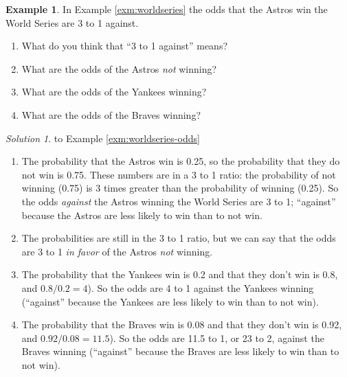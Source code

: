 \documentclass[
]{book}
\providecommand{\tightlist}{%
  \setlength{\itemsep}{0pt}\setlength{\parskip}{0pt}}
\theoremstyle{definition}
\theoremstyle{definition}
\newtheorem{example}{Example}[chapter]
\theoremstyle{definition}
\theoremstyle{remark}
\newtheorem*{solution}{Solution}
\begin{document}
\begin{example}
\protect\hypertarget{exm:worldseries-odds}{}{\label{exm:worldseries-odds} }
In Example \ref{exm:worldseries} the odds that the Astros win the World Series are 3 to 1 against.
\end{example}

\begin{enumerate}
\def\labelenumi{\arabic{enumi}.}
\tightlist
\item
  What do you think that ``3 to 1 against'' means?
\item
  What are the odds of the Astros \emph{not} winning?
\item
  What are the odds of the Yankees winning?
\item
  What are the odds of the Braves winning?
\end{enumerate}

\begin{solution}
{}
to Example \ref{exm:worldseries-odds}
\end{solution}

\begin{enumerate}
\def\labelenumi{\arabic{enumi}.}
\tightlist
\item
  The probability that the Astros win is 0.25, so the probability that they do not win is 0.75. These numbers are in a 3 to 1 ratio: the probability of not winning (0.75) is 3 times greater than the probability of winning (0.25). So the odds \emph{against} the Astros winning the World Series are 3 to 1; ``against'' because the Astros are less likely to win than to not win.
\item
  The probabilities are still in the 3 to 1 ratio, but we can say that the odds are 3 to 1 \emph{in favor} of the Astros \emph{not} winning.
\item
  The probability that the Yankees win is 0.2 and that they don't win is 0.8, and \(0.8/0.2 = 4\)). So the odds are 4 to 1 against the Yankees winning (``against'' because the Yankees are less likely to win than to not win).
\item
  The probability that the Braves win is 0.08 and that they don't win is 0.92, and \(0.92/0.08 = 11.5\)). So the odds are 11.5 to 1, or 23 to 2, against the Braves winning (``against'' because the Braves are less likely to win than to not win).
\end{enumerate}
\end{document}
